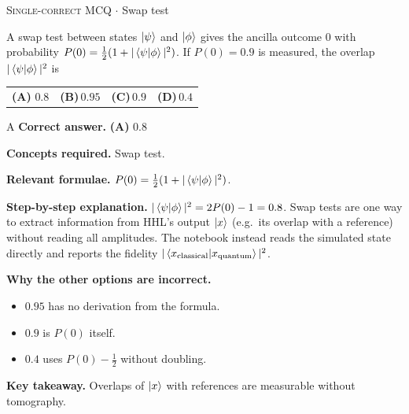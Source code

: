 \documentclass[11pt,a4paper]{article}
\newcommand{\optlabel}[1]{\textbf{(#1)}}
\newcommand{\correctlabel}[1]{\textcolor{okgreen}{\textbf{(#1)}\,\ding{51}}}
\newenvironment{qitem}[1]{\begin{list}{}{\setlength{\leftmargin}{3.3em}\setlength{\labelwidth}{3.1em}%
  \setlength{\labelsep}{0.2em}\setlength{\topsep}{3pt}\setlength{\parsep}{3pt}}\item[\textbf{Q.#1}\hfill]}{\end{list}}
\newcommand{\qsep}{\par\vspace{2pt}{\color{black!15}\hrule}\vspace{4pt}}
\newcommand{\qmeta}[2]{{\footnotesize\color{black!60}\textsc{#1} \;$\cdot$\; #2}\par}
\begin{document}
\begin{qitem}{36}
\qmeta{Single-correct MCQ}{Swap test}
A swap test between states $\ket\psi$ and $\ket\phi$ gives the ancilla outcome 0 with probability $P(0) = \tfrac12(1 + |\braket{\psi|\phi}|^2)$. If $P(0) = 0.9$ is measured, the overlap
$|\braket{\psi|\phi}|^2$ is
\par\smallskip\noindent\begin{tabularx}{\linewidth}{@{}*{4}{L}@{}}
\correctlabel{A}\,$0.8$ & \optlabel{B}\,$0.95$ & \optlabel{C}\,$0.9$ & \optlabel{D}\,$0.4$
\end{tabularx}
\end{qitem}
\begin{solbox}{A}
\textbf{\color{brand}Correct answer.} \textcolor{okgreen}{\textbf{(A)}} $0.8$

\textbf{\color{brand}Concepts required.} Swap test.

\textbf{\color{brand}Relevant formulae.} $P(0) = \frac12(1 + |\braket{\psi|\phi}|^2)$.

\textbf{\color{brand}Step-by-step explanation.} $|\braket{\psi|\phi}|^2 = 2P(0) - 1 = 0.8$. Swap tests are one way to extract information from HHL's output $\ket x$ (e.g.\ its overlap with a reference) without reading all amplitudes.
The notebook instead reads the simulated state directly and reports the fidelity $|\braket{x_{\text{classical}}|x_{\text{quantum}}}|^2$.

\textbf{\color{brand}Why the other options are incorrect.}
\begin{itemize}[leftmargin=2.4em, itemsep=1pt, topsep=2pt]
\item[\textbf{(B)}] $0.95$ has no derivation from the formula.
\item[\textbf{(C)}] $0.9$ is $P(0)$ itself.
\item[\textbf{(D)}] $0.4$ uses $P(0) - \frac12$ without doubling.
\end{itemize}
\textbf{\color{brand}Key takeaway.} Overlaps of $\ket x$ with references are measurable without tomography.
\end{solbox}
\qsep
\end{document}
